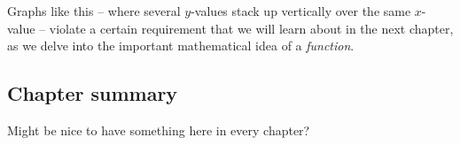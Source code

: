 Graphs like this -- where several $y$-values stack up vertically over the same $x$-value -- violate a certain requirement that we will learn about in the next chapter, as we delve into the important mathematical idea of a \textit{function}.

\subsection*{Chapter summary}

Might be nice to have something here in every chapter?
